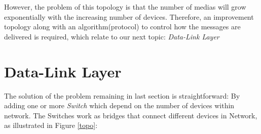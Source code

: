 \documentclass[10pt,a4paper]{article}
\begin{document}
However, the problem of this topology is that the number of medias will grow exponentially with the increasing number of devices. Therefore, an improvement topology along with an algorithm(protocol) to control how the messages are delivered is required, which relate to our next topic: \textit{Data-Link Layer}

\section{Data-Link Layer}
The solution of the problem remaining in last section is straightforward: By adding one or more \textit{Switch} which depend on the number of devices within network. The Switches work as bridges that connect different devices in Network, as illustrated in Figure \ref{topo}:
\begin{figure}[ht]
\center
{} \\


\end{figure}
\end{document}
